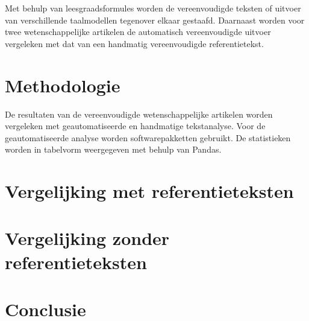 Met behulp van leesgraadsformules worden de vereenvoudigde teksten of uitvoer van verschillende taalmodellen tegenover elkaar gestaafd. Daarnaast worden voor twee wetenschappelijke artikelen de automatisch vereenvoudigde uitvoer vergeleken met dat van een handmatig vereenvoudigde referentietekst. %

\section{Methodologie}

De resultaten van de vereenvoudigde wetenschappelijke artikelen worden vergeleken met geautomatiseerde en handmatige tekstanalyse. Voor de geautomatiseerde analyse worden softwarepakketten gebruikt. De statistieken worden in tabelvorm weergegeven met behulp van Pandas. 




\section{Vergelijking met referentieteksten}

\section{Vergelijking zonder referentieteksten}





\section{Conclusie}

